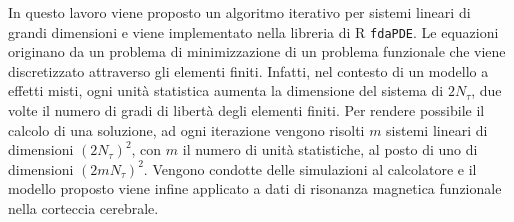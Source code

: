 
In questo lavoro viene proposto un algoritmo iterativo per sistemi
lineari di grandi dimensioni e viene implementato nella libreria di
R \texttt{fdaPDE}.
Le equazioni originano da un problema di minimizzazione di un
problema funzionale che viene discretizzato attraverso gli elementi
finiti. Infatti, nel contesto di un modello a effetti misti, ogni
unità statistica aumenta la dimensione del sistema di $2 N_{\tau}$, 
due volte il numero di gradi di libertà degli elementi finiti.\newline
Per rendere possibile il calcolo di una soluzione, ad ogni iterazione
vengono risolti $m$ sistemi lineari di dimensioni
$\left(2 N_{\tau}\right)^2$, con $m$ il numero di unità statistiche,
al posto di uno di dimensioni $\left(2m N_{\tau}\right)^2$.\newline
Vengono condotte delle simulazioni al calcolatore e il modello proposto
viene infine applicato a dati di risonanza magnetica funzionale nella
corteccia cerebrale.

